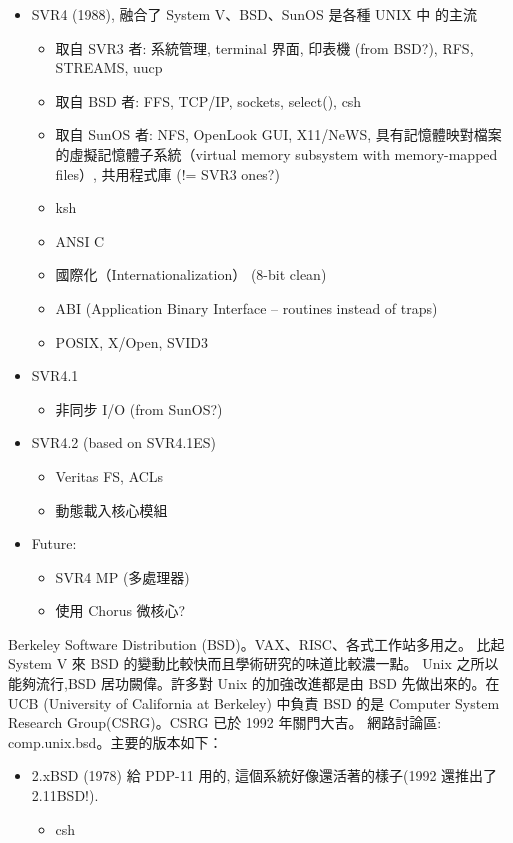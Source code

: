 \documentclass{article}
\begin{document}
\begin{CJK*}{Bg5}{ming}
\begin{itemize}
         \item SVR4 (1988), 融合了 System V、BSD、SunOS 是各種 UNIX 中 
           的主流
	 \begin{itemize}
           \item 取自 SVR3 者: 系統管理, terminal 界面, 印表機 (from BSD?),
             RFS, STREAMS, uucp
           \item 取自 BSD 者: FFS, TCP/IP, sockets, select(), csh
           \item 取自 SunOS 者: NFS, OpenLook GUI, X11/NeWS,
             具有記憶體映對檔案的虛擬記憶體子系統（virtual memory
             subsystem with memory-mapped files）, 共用程式庫
             (!= SVR3 ones?)
           \item ksh
           \item ANSI C
           \item 國際化（Internationalization） (8-bit clean)
           \item ABI (Application Binary Interface -- routines instead of traps)
           \item POSIX, X/Open, SVID3
	 \end{itemize}

         \item SVR4.1
	 \begin{itemize}
           \item 非同步 I/O (from SunOS?)
	 \end{itemize}

         \item SVR4.2 (based on SVR4.1ES)
	 \begin{itemize}
           \item Veritas FS, ACLs
           \item 動態載入核心模組
	 \end{itemize}

         \item Future:
	 \begin{itemize}
           \item SVR4 MP (多處理器)
           \item 使用 Chorus 微核心?
	 \end{itemize}
\end{itemize}

    Berkeley Software Distribution (BSD)。VAX、RISC、各式工作站多用之。
    比起 System V 來 BSD 的變動比較快而且學術研究的味道比較濃一點。
    Unix 之所以能夠流行,BSD 居功闕偉。許多對 Unix 的加強改進都是由
    BSD 先做出來的。在 UCB (University of California at Berkeley) 中負責 BSD 
    的是 Computer System Research Group(CSRG)。CSRG 已於 1992 年關門大吉。
    網路討論區: comp.unix.bsd。主要的版本如下：
\begin{itemize}
         \item 2.xBSD (1978) 給 PDP-11 用的, 這個系統好像還活著的樣子(1992 
           還推出了 2.11BSD!).
	   \begin{itemize}
           \item csh
	   \end{itemize}


\end{itemize}
\end{CJK*}
\end{document}
